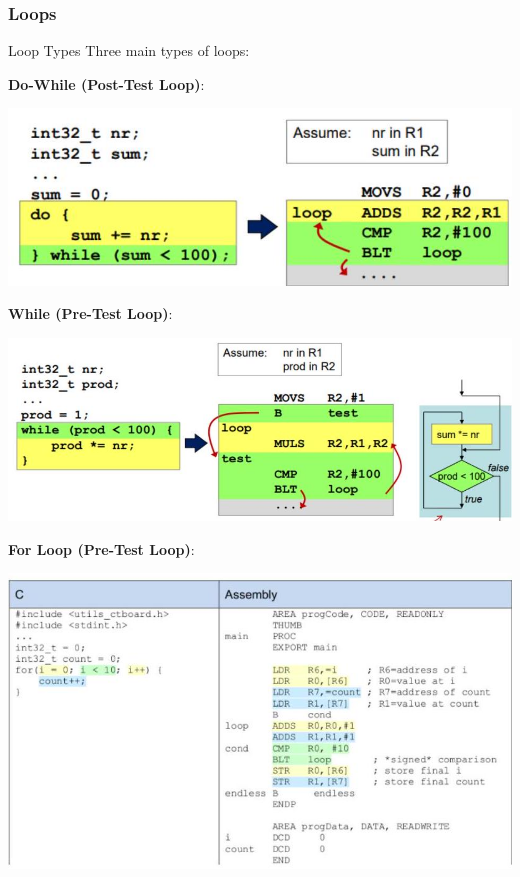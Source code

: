 \subsubsection{Loops}

\begin{concept}{Loop Types}
Three main types of loops:

\textbf{Do-While (Post-Test Loop)}:

\includegraphics[width=\linewidth]{images/2024_12_29_79e6b22f503fb7b4f718g-07}

\textbf{While (Pre-Test Loop)}:

\includegraphics[width=\linewidth]{images/2024_12_29_79e6b22f503fb7b4f718g-07(1)}

\textbf{For Loop (Pre-Test Loop)}:

\includegraphics[width=\linewidth]{images/2024_12_29_79e6b22f503fb7b4f718g-07(2)}
\end{concept}


